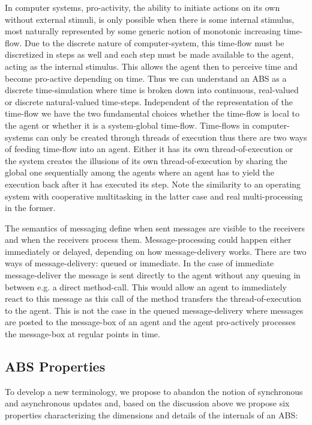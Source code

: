 In computer systems, pro-activity, the ability to initiate actions on its own without external stimuli, is only possible when there is some internal stimulus, most naturally represented by some generic notion of monotonic increasing time-flow. Due to the discrete nature of computer-system, this time-flow must be discretized in steps as well and each step must be made available to the agent, acting as the internal stimulus. This allows the agent then to perceive time and become pro-active depending on time. Thus we can understand an ABS as a discrete time-simulation where time is broken down into continuous, real-valued or discrete natural-valued time-steps. Independent of the representation of the time-flow we have the two fundamental choices whether the time-flow is local to the agent or whether it is a system-global time-flow. Time-flows in computer-systems can only be created through threads of execution thus there are two ways of feeding time-flow into an agent. Either it has its own thread-of-execution or the system creates the illusions of its own thread-of-execution by sharing the global one sequentially among the agents where an agent has to yield the execution back after it has executed its step. Note the similarity to an operating system with cooperative multitasking in the latter case and real multi-processing in the former.

\medskip 

The semantics of messaging define when sent messages are visible to the receivers and when the receivers process them. Message-processing could happen either immediately or delayed, depending on how message-delivery works. There are two ways of message-delivery: queued or immediate. In the case of immediate message-deliver the message is sent directly to the agent without any queuing in between e.g. a direct method-call. This would allow an agent to immediately react to this message as this call of the method transfers the thread-of-execution to the agent. This is not the case in the queued message-delivery where messages are posted to the message-box of an agent and the agent pro-actively processes the message-box at regular points in time.

\subsection{ABS Properties}
To develop a new terminology, we propose to abandon the notion of synchronous and asynchronous updates and, based on the discussion above we propose six properties characterizing the dimensions and details of the internals of an ABS:

